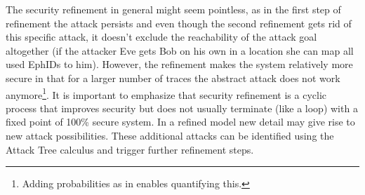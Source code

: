 \documentclass{llncs}
\begin{document}
The security refinement in general might seem pointless, as in the first step of refinement the attack
persists and even though the second refinement gets rid of this specific attack, it doesn't exclude the
reachability of the attack goal altogether (if the attacker Eve gets Bob on his own in a location she can
map all used EphIDs to him).
However, the refinement makes the system relatively more secure in that for a larger number of traces the abstract
attack does not work anymore\footnote{Adding probabilities as in \cite{kam:19c} enables quantifying this.}. 
It is important to emphasize that security refinement is a cyclic process that
improves security but does not usually terminate (like a loop) with a fixed point of 100\% secure system.
In a refined model new detail may give rise to new attack possibilities. These additional attacks can be
identified using the Attack Tree calculus and trigger further refinement steps.



\end{document}
